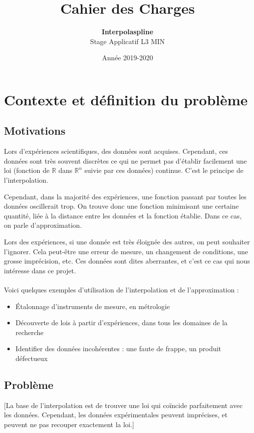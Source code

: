 \documentclass[a4paper,12pt]{article}
\title{Cahier des Charges}
\author{\textbf{Interpolaspline}\\Stage Applicatif L3 MIN}
\date{Année 2019-2020}
\newcommand{\IKex}[2]{\mathbb{#1}^{#2}}
\newcommand{\IK}[1]{\mathbb{#1}}
\newcommand{\IRex}[1]{\IKex{R}{#1}}
\newcommand{\IR}{\IK{R}}
\begin{document}
\maketitle
\tableofcontents

\newpage

\section{Contexte et définition du problème}

\subsection{Motivations}

Lors d'expériences scientifiques, des données sont acquises. Cependant, ces données sont très souvent discrètes ce qui ne permet pas d'établir facilement une loi (fonction de $\IR$ dans $\IRex{n}$ suivie par ces données) continue. C'est le principe de l'interpolation.

Cependant, dans la majorité des expériences, une fonction passant par toutes les données oscillerait trop. On trouve donc une fonction minimisant une certaine quantité, liée à la distance entre les données et la fonction établie. Dans ce cas, on parle d'approximation.

Lors des expériences, si une donnée est très éloignée des autres, on peut souhaiter l'ignorer. Cela peut-être une erreur de mesure, un changement de conditions, une grosse imprécision, etc. Ces données sont dites aberrantes, et c'est ce cas qui nous intéresse dans ce projet.
\\ \\
Voici quelques exemples d'utilisation de l'interpolation et de l'approximation :
\begin{itemize}
\item Étalonnage d'instruments de mesure, en métrologie
\item Découverte de lois à partir d'expériences, dans tous les domaines de la recherche
\item Identifier des données incohérentes : une faute de frappe, un produit défectueux
\end{itemize}


\subsection{Problème}

[La base de l'interpolation est de trouver une loi qui coïncide parfaitement avec les données. Cependant, les données expérimentales peuvent imprécises, et peuvent ne pas recouper exactement la loi.]
\end{document}
